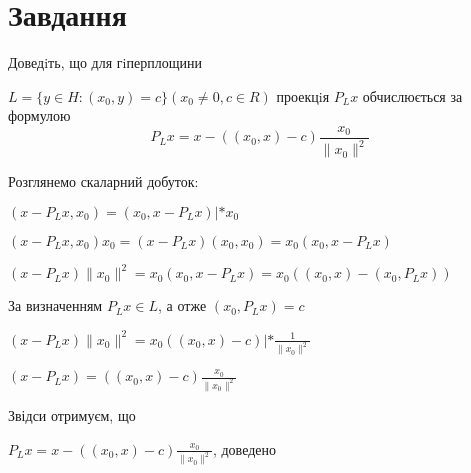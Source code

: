 
\chapter{Завдання \theHchapter}


\begin{tcolorbox}[title=Завдання]
    
    Доведiть, що для гiперплощини 
    
    
    $ L = \{y \in H : (x_0, y) = c\} (x_0 \neq 0, c \in R)$
    проекцiя $P_Lx$ обчислюється за формулою
    $$ P_Lx = x - ((x_0, x) - c) \frac{x_0}{\| x_0 \| ^ 2} $$
    
\end{tcolorbox}


Розглянемо скаларний добуток:

$ (x - P_Lx, x_0) = (x_0, x - P_Lx) | * x_0$


$ (x - P_Lx, x_0) x_0 = (x - P_Lx) (x_0, x_0) = x_0 (x_0, x - P_Lx) $


$ (x - P_Lx) \| x_0\|^2 = x_0 (x_0, x - P_Lx) 
= x_0 ((x_0, x) - (x_0, P_Lx)) $


За визначенням $ P_Lx \in L$, а отже $(x_0, P_Lx) = c$


$ (x - P_Lx) \| x_0\|^2 = x_0 ((x_0, x) - c) | * \frac{1}{\|x_0\|^2}$


$ (x - P_Lx) = ((x_0, x) - c) \frac{x_0}{\| x_0\|^2 } $


Звідси отримуєм, що 

$ P_Lx = x - ((x_0, x) - c) \frac{x_0}{\| x_0 \| ^ 2} $, доведено